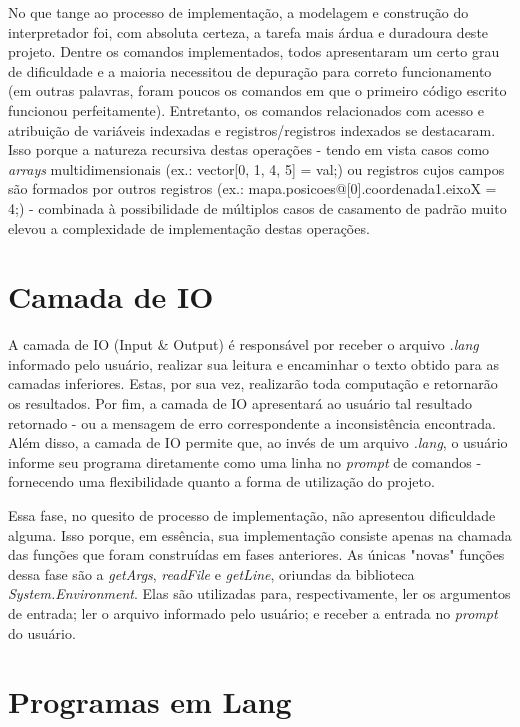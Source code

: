 \documentclass{article}
\begin{document}
No que tange ao processo de implementação, a modelagem e construção do interpretador foi, com absoluta certeza, a tarefa mais árdua e duradoura deste projeto. Dentre os comandos implementados, todos apresentaram um certo grau de dificuldade e a maioria necessitou de depuração para correto funcionamento (em outras palavras, foram poucos os comandos em que o primeiro código escrito funcionou perfeitamente). Entretanto, os comandos relacionados com acesso e atribuição de variáveis indexadas e registros/registros indexados se destacaram. Isso porque a natureza recursiva destas operações - tendo em vista casos como \textit{arrays} multidimensionais (ex.: vector[0, 1, 4, 5] = val;) ou registros cujos campos são formados por outros registros (ex.: mapa.posicoes@[0].coordenada1.eixoX = 4;) - combinada à possibilidade de múltiplos casos de casamento de padrão muito elevou a complexidade de implementação destas operações.

\section{Camada de IO}
A camada de IO (Input \& Output) é responsável por receber o arquivo \textit{.lang} informado pelo usuário, realizar sua leitura e encaminhar o texto obtido para as camadas inferiores. Estas, por sua vez, realizarão toda computação e retornarão os resultados. Por fim, a camada de IO apresentará ao usuário tal resultado retornado - ou a mensagem de erro correspondente a inconsistência encontrada. Além disso, a camada de IO permite que, ao invés de um arquivo \textit{.lang}, o usuário informe seu programa diretamente como uma linha no \textit{prompt} de comandos - fornecendo uma flexibilidade quanto a forma de utilização do projeto.

Essa fase, no quesito de processo de implementação, não apresentou dificuldade alguma. Isso porque, em essência, sua implementação consiste apenas na chamada das funções que foram construídas em fases anteriores. As únicas "novas" funções dessa fase são a \textit{getArgs}, \textit{readFile} e \textit{getLine}, oriundas da biblioteca \textit{System.Environment}. Elas são utilizadas para, respectivamente, ler os argumentos de entrada; ler o arquivo informado pelo usuário; e receber a entrada no \textit{prompt} do usuário.

\section{Programas em Lang}
\end{document}

